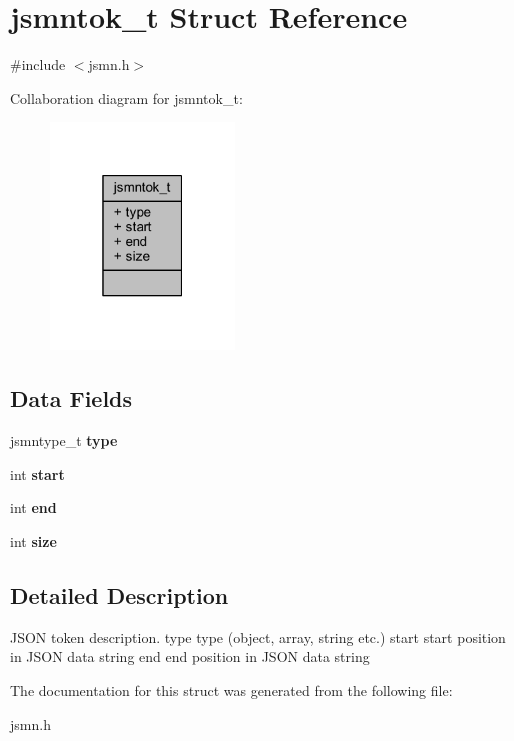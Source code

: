 \hypertarget{structjsmntok__t}{}\section{jsmntok\+\_\+t Struct Reference}
\label{structjsmntok__t}


{\ttfamily \#include $<$jsmn.\+h$>$}



Collaboration diagram for jsmntok\+\_\+t\+:
\nopagebreak
\begin{figure}[H]
\begin{center}
\leavevmode
\includegraphics[width=139pt]{structjsmntok__t__coll__graph}
\end{center}
\end{figure}
\subsection*{Data Fields}
\begin{DoxyCompactItemize}
\item 
\mbox{\label{structjsmntok__t_a7def41ebc3980f6e4526819b42c2721f}} 
jsmntype\+\_\+t {\bfseries type}
\item 
\mbox{\label{structjsmntok__t_a37722a150250e2a5a98e5e0d11e53449}} 
int {\bfseries start}
\item 
\mbox{\label{structjsmntok__t_abce9f5dc9c83f2639b72024fdee5d388}} 
int {\bfseries end}
\item 
\mbox{\label{structjsmntok__t_a439227feff9d7f55384e8780cfc2eb82}} 
int {\bfseries size}
\end{DoxyCompactItemize}


\subsection{Detailed Description}
J\+S\+ON token description. type type (object, array, string etc.) start start position in J\+S\+ON data string end end position in J\+S\+ON data string 

The documentation for this struct was generated from the following file\+:\begin{DoxyCompactItemize}
\item 
jsmn.\+h\end{DoxyCompactItemize}
